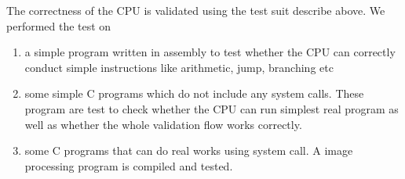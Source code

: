 The correctness of the CPU is validated using the test suit describe above. We performed the test on
\begin{enumerate}
    \item a simple program written in assembly to test whether the CPU can correctly conduct simple instructions like arithmetic, jump, branching etc
    \item some simple C programs which do not include any system calls. These program are test to check whether the CPU can run simplest real program as well as whether the whole validation flow works correctly.
    \item some C programs that can do real works using system call. A image processing program is compiled and tested.
\end{enumerate}

